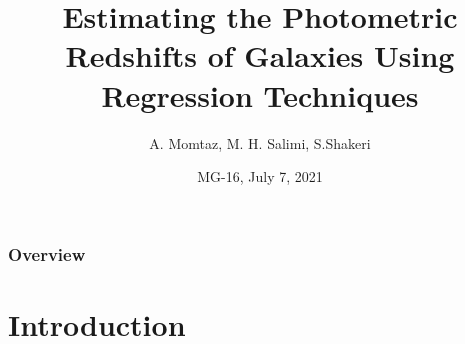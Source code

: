 \documentclass{beamer}
\title[Photometric Redshifts]{Estimating the Photometric Redshifts of Galaxies Using Regression Techniques} %
\author[Momtaz, Salimi, Shakeri]{ A. Momtaz, M. H. Salimi, S.Shakeri}
\institute[IUT] %
{
Department of Physics, Isfahan University of Technology, Isfahan 84156-8311, Iran. \\ %
\medskip
\textit{aidinmomtaz@ph.iut.ac.ir\\mhsalimi@ph.iut.ac.ir\\s.shakeri@iut.ac.ir} %
}
\date{MG-16, July 7, 2021} %
\begin{document}
\begin{frame}
\titlepage %
\end{frame}


\begin{frame}
\frametitle{Overview} %
\tableofcontents %
\end{frame}

\section{Introduction}
\end{document}
